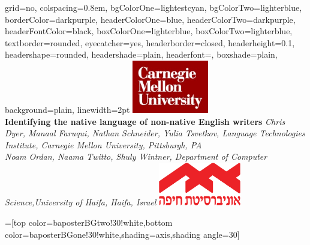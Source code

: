 \documentclass[landscape,final]{baposter}
\begin{document}
\begin{poster}{
  grid=no,
  colspacing=0.8em,
  bgColorOne=lightestcyan, %
  bgColorTwo=lighterblue, %
  borderColor=darkpurple, %
  headerColorOne=blue, %
  headerColorTwo=darkpurple, %
  headerFontColor=black,
  boxColorOne=lighterblue, %
  boxColorTwo=lighterblue, %
  textborder=rounded, %
  eyecatcher=yes,
  headerborder=closed,
  headerheight=0.1\textheight,
  headershape=rounded, %
  headershade=plain,
  headerfont=\Large\textsf, %
  boxshade=plain,
  background=plain,
  linewidth=2pt
  }
  {%
\includegraphics[width=9em]{img/CarnegieMellonUniversity}\\
} %
  {\bf %
  Identifying the native language of non-native English writers 
  }
  {\large\sl %
  Chris Dyer, Manaal Faruqui, Nathan Schneider, Yulia Tsvetkov, Language Technologies Institute,
  Carnegie Mellon University, Pittsburgh, PA
  \large
  \\Noam Ordan, Naama Twitto, Shuly Wintner,
  Department of Computer Science,University of Haifa, Haifa, Israel
  }
  {  \includegraphics[height=5.1em]{img/University_of_Haifa_logo} %
  }

  =[top color=baposterBGtwo!30!white,bottom color=baposterBGone!30!white,shading=axis,shading angle=30]



\end{poster}
\end{document}
